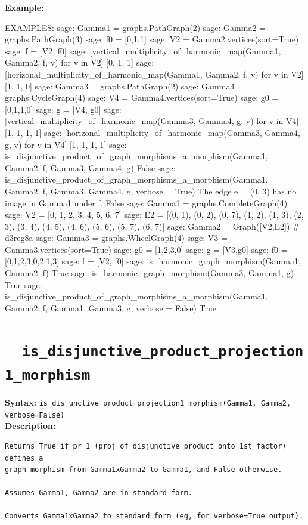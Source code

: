 \documentclass{article}
\begin{document}
\noindent
\textbf{Example:}
{\small{
\begin{spverbatim}
EXAMPLES:
    sage: Gamma1 = graphs.PathGraph(2)
    sage: Gamma2 = graphs.PathGraph(3)
    sage: f0 = [0,1,1]       
    sage: V2 = Gamma2.vertices(sort=True) 
    sage: f = [V2, f0]     
    sage: [vertical_multiplicity_of_harmonic_map(Gamma1, Gamma2, f, v) for v in V2] 
    [0, 1, 1]
    sage: [horizonal_multiplicity_of_harmonic_map(Gamma1, Gamma2, f, v) for v in V2]
    [1, 1, 0]
    sage: Gamma3 = graphs.PathGraph(2) 
    sage: Gamma4 = graphs.CycleGraph(4) 
    sage: V4 = Gamma4.vertices(sort=True) 
    sage: g0 = [0,1,1,0]     
    sage: g = [V4, g0]  
    sage: [vertical_multiplicity_of_harmonic_map(Gamma3, Gamma4, g, v) for v in V4] 
    [1, 1, 1, 1]
    sage: [horizonal_multiplicity_of_harmonic_map(Gamma3, Gamma4, g, v) for v in V4]  
    [1, 1, 1, 1]
    sage: is_disjunctive_product_of_graph_morphisms_a_morphism(Gamma1, Gamma2, f, Gamma3, Gamma4, g) 
    False
    sage: is_disjunctive_product_of_graph_morphisms_a_morphism(Gamma1, Gamma2, f, Gamma3, Gamma4, g, verbose = True) 
    The edge e =  (0, 3)  has no image in Gamma1 under f.
    False
    sage: Gamma1 = graphs.CompleteGraph(4)
    sage: V2 = [0, 1, 2, 3, 4, 5, 6, 7] 
    sage: E2 = [(0, 1), (0, 2), (0, 7), (1, 2), (1, 3), (2, 3), (3, 4), (4, 5), (4, 6), (5, 6), (5, 7), (6, 7)]
    sage: Gamma2 = Graph([V2,E2]) # d3reg8a
    sage: Gamma3 = graphs.WheelGraph(4)
    sage: V3 = Gamma3.vertices(sort=True)
    sage: g0 = [1,2,3,0]
    sage: g = [V3,g0]
    sage: f0 = [0,1,2,3,0,2,1,3]
    sage: f = [V2, f0]
    sage: is_harmonic_graph_morphism(Gamma1, Gamma2, f)
    True
    sage: is_harmonic_graph_morphism(Gamma3, Gamma1, g)
    True
    sage: is_disjunctive_product_of_graph_morphisms_a_morphism(Gamma1, Gamma2, f, Gamma1, Gamma3, g, verbose = False)
    True
\end{spverbatim}
}}

\section{\tt \ \ is\_disjunctive\_product\_projection1\_morphism}

\textbf{Syntax:}
\verb}is_disjunctive_product_projection1_morphism(Gamma1, Gamma2, verbose=False)}\\

\textbf{Description:}
\begin{verbatim}
Returns True if pr_1 (proj of disjunctive product onto 1st factor) defines a 
graph morphism from Gamma1xGamma2 to Gamma1, and False otherwise. 

Assumes Gamma1, Gamma2 are in standard form.

Converts Gamma1xGamma2 to standard form (eg, for verbose=True output).
\end{verbatim}
\end{document}

